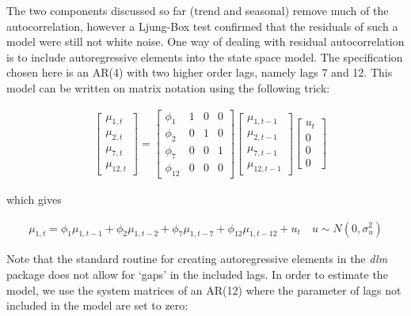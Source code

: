 \documentclass[12pt, a4paper]{article}
\begin{document}
The two components discussed so far (trend and seasonal) remove much of
the autocorrelation, however a Ljung-Box test confirmed that the
residuals of such a model were still not white noise. One
way of dealing with residual autocorrelation is to include
autoregressive elements into the state space model. The specification chosen here is
an AR(4) with two higher order lags, namely lags 7 and 12. This model can be written on matrix notation using the following trick:

\begin{align*}
&\begin{bmatrix}
 \mu_{1,t} \\ \mu_{2,t} \\ \mu_{7,t} \\ \mu_{12,t} 
\end{bmatrix} =  \begin{bmatrix} 
\phi_{1} & 1 & 0 & 0 \\ 
\phi_{2} & 0 & 1 & 0 \\
\phi_{7} & 0 & 0 & 1 \\
\phi_{12} & 0 & 0 & 0 
\end{bmatrix} \begin{bmatrix} 
\mu_{1,t-1} \\ \mu_{2,t-1} \\ \mu_{7,t-1} \\ \mu_{12,t-1} 
\end{bmatrix} \begin{bmatrix}
u_{t} \\ 0 \\ 0 \\ 0 
\end{bmatrix}
\end{align*}

which gives

\begin{align}
\mu_{1,t} = \phi_{1} \mu_{1,t-1} + \phi_{2} \mu_{1,t-2} + \phi_{7} \mu_{1,t-7} + \phi_{12} \mu_{1,t-12} + u_{t} \quad u \sim N(0, \sigma^{2}_{u})
\end{align}

Note that the standard routine for creating autoregressive elements in
the \emph{dlm} package does not allow for `gaps' in the included lags. In
order to estimate the model, we use the system matrices of
an AR(12) where the parameter of lags not included in the model are set
to zero:
\end{document}
